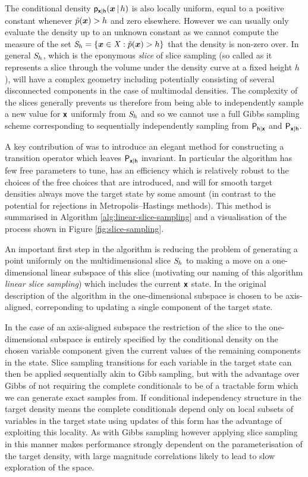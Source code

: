 The conditional density $\mathsf{p}_{\boldsymbol{\mathsf{x}}|\mathsf{h}}(\boldsymbol{x}\operatorname{|} h)$ is also locally uniform, equal to a positive constant whenever $\tilde{p}(\boldsymbol{x}) > h$ and zero elsewhere. However we can usually only evaluate the density up to an unknown constant as we cannot compute the measure of the set $\set{S}_h = \fset{\vct{x} \in \set{X} : \utgtdens(\vct{x}) > h}$ that the density is non-zero over. In general $\mathit{S}_h$, which is the eponymous \emph{slice} of slice sampling (so called as it represents a slice through the volume under the density curve at a fixed height $h$), will have a complex geometry including potentially consisting of several disconnected components in the case of multimodal densities. The complexity of the slices generally prevents us therefore from being able to independently sample a new value for $\boldsymbol{\mathsf{x}}$ uniformly from $\mathit{S}_h$ and so we cannot use a full Gibbs sampling scheme corresponding to sequentially independently sampling from $\mathsf{P}_{\mathsf{h}|\boldsymbol{\mathsf{x}}}$ and $\mathsf{P}_{\boldsymbol{\mathsf{x}}|\mathsf{h}}$.

A key contribution of \citep{neal2003slice} was to introduce an elegant method for constructing a transition operator which leaves $\mathsf{P}_{\boldsymbol{\mathsf{x}}|\mathsf{h}}$ invariant. In particular the algorithm has few free parameters to tune, has an efficiency which is relatively robust to the choices of the free choices that are introduced, and will for smooth target densities always move the target state by some amount (in contrast to the potential for rejections in Metropolis--Hastings methods). This method is summarised in Algorithm \ref{alg:linear-slice-sampling} and a visualisation of the process shown in Figure \ref{fig:slice-sampling}.

An important first step in the algorithm is reducing the problem of generating a point uniformly on the multidimensional slice $\mathit{S}_h$ to making a move on a one-dimensional linear subspace of this slice  (motivating our naming of this algorithm \emph{linear slice sampling}) which includes the current $\boldsymbol{\mathsf{x}}$ state. In the original description of the algorithm in \citep{neal2003slice} the one-dimensional subspace is chosen to be axis-aligned, correponding to updating a single component of the target state. 

In the case of an axis-aligned subspace the restriction of the slice to the one-dimensional subspace is entirely specified by the conditional density on the chosen variable component given the current values of the remaining components in the state. Slice sampling transitions for each variable in the target state can then be applied sequentially akin to Gibb sampling, but with the advantage over Gibbs of not requiring the complete conditionals to be of a tractable form which we can generate exact samples from. If conditional independency structure in the target density means the complete conditionals depend only on local subsets of variables in the target state using updates of this form has the advantage of exploiting this locality. As with Gibbs sampling however applying slice sampling in this manner makes performance strongly dependent on the parameterisation of the target density, with large magnitude correlations likely to lead to slow exploration of the space. 

